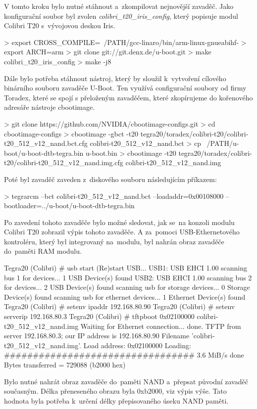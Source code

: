 V tomto kroku bylo nutné stáhnout a~zkompilovat nejnovější zavaděč.
Jako konfigurační soubor byl zvolen {\em colibri\_t20\_iris\_config}, který popisuje modul Colibri T20 s~vývojovou deskou Iris.

\begtt
> export CROSS_COMPILE=~/PATH/gcc-linaro/bin/arm-linux-gnueabihf-
> export ARCH=arm
> git clone git://git.denx.de/u-boot.git
> make colibri_t20_iris_config
> make -j8
\endtt

Dále bylo potřeba stáhnout nástroj, který by sloužil k~vytvoření cílového binárního souboru zavaděče U-Boot.
Ten využívá configurační soubory od firmy Toradex, které se spojí s přeloženým zavaděčem, které zkopírujeme do kořenového adresáře nástroje cbootimage.

\begtt
> git clone https://github.com/NVIDIA/cbootimage-configs.git
> cd cbootimage-configs
> cbootimage -gbct -t20
		tegra20/toradex/colibri-t20/colibri-t20_512_v12_nand.bct.cfg
 		colibri-t20_512_v12_nand.bct
> cp ~/PATH/u-boot/u-boot-dtb-tegra.bin u-boot.bin
> cbootimage -t20
 		tegra20/toradex/colibri-t20/colibri-t20_512_v12_nand.img.cfg
 		colibri-t20_512_v12_nand.img
\endtt

Poté byl zavaděč zaveden z~diskového souboru následujícím příkazem:

\begtt
> tegrarcm --bct colibri-t20_512_v12_nand.bct --loadaddr=0x00108000
 		--bootloader=../u-boot/u-boot-dtb-tegra.bin
\endtt

Po zavedení tohoto zavaděče bylo možné sledovat, jak se~na konzoli modulu Colibri T20 zobrazil výpis tohoto zavaděče.
A za~pomoci USB-Ethernetového kontroléru, který byl integrovaný na~modulu, byl nahrán obraz zavaděče do~paměti RAM modulu.

\begtt
Tegra20 (Colibri) # usb start
(Re)start USB...
USB1: USB EHCI 1.00
scanning bus 1 for devices... 1 USB Device(s) found
USB2: USB EHCI 1.00
scanning bus 2 for devices... 2 USB Device(s) found
 scanning usb for storage devices... 0 Storage Device(s) found
 scanning usb for ethernet devices... 1 Ethernet Device(s) found
Tegra20 (Colibri) # setenv ipaddr 192.168.80.90
Tegra20 (Colibri) # setenv serverip 192.168.80.3
Tegra20 (Colibri) # tftpboot 0x02100000 colibri-t20_512_v12_nand.img
Waiting for Ethernet connection... done.
TFTP from server 192.168.80.3; our IP address is 192.168.80.90
Filename 'colibri-t20_512_v12_nand.img'.
Load address: 0x02100000
Loading: #################################
         3.6 MiB/s
done
Bytes transferred = 729088 (b2000 hex)
\endtt

Bylo nutné nahrát obraz zavaděče do~paměti NAND a~přepsat původní zavaděč současným.
Délka přeneseného obrazu byla 0xb2000, viz výpis výše.
Tato hodnota byla potřeba k~určení délky přepisovaného úseku NAND paměti.

